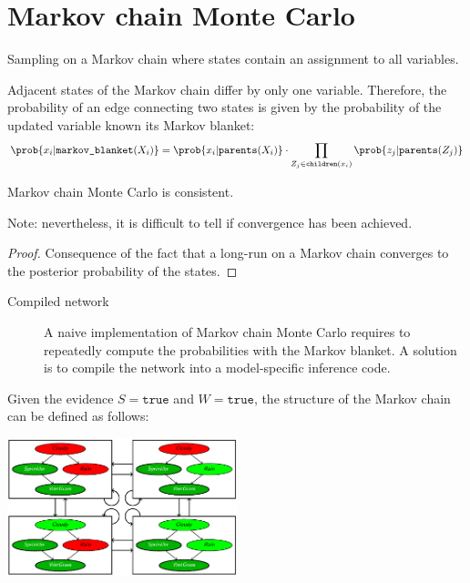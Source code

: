 \section{Markov chain Monte Carlo}

Sampling on a Markov chain where states contain an assignment to all variables.

Adjacent states of the Markov chain differ by only one variable.
Therefore, the probability of an edge connecting two states is given by the probability of the updated variable known its Markov blanket:
\[ 
    \prob{x_i | \texttt{markov\_blanket}(X_i)} = 
    \prob{x_i | \texttt{parents}(X_i)} \cdot \prod_{Z_j \in \texttt{children}(x_i)} \prob{z_j | \texttt{parents}(Z_j)} 
\]

\begin{theorem}
    Markov chain Monte Carlo is consistent.

    Note: nevertheless, it is difficult to tell if convergence has been achieved.

    \begin{proof}
        Consequence of the fact that a long-run on a Markov chain converges to the posterior probability of the states.
    \end{proof}
\end{theorem}

\begin{description}
    \item[Compiled network]
        A naive implementation of Markov chain Monte Carlo requires to repeatedly compute the probabilities with the Markov blanket.
        A solution is to compile the network into a model-specific inference code.
\end{description}

\begin{example}
    Given the evidence $S=\texttt{true}$ and $W=\texttt{true}$,
    the structure of the Markov chain can be defined as follows:
    \begin{center}
        \includegraphics[width=0.5\textwidth]{img/_markov_chain_sampling.pdf}
    \end{center}
\end{example}